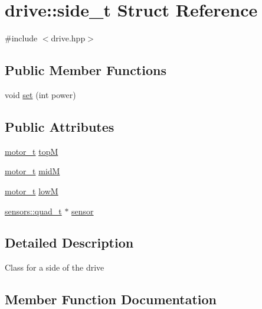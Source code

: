 \hypertarget{structdrive_1_1side__t}{}\section{drive\+:\+:side\+\_\+t Struct Reference}
\label{structdrive_1_1side__t}


{\ttfamily \#include $<$drive.\+hpp$>$}

\subsection*{Public Member Functions}
\begin{DoxyCompactItemize}
\item 
void \hyperlink{structdrive_1_1side__t_ab605b00c5f98faa239cab1b19b54e7e6}{set} (int power)
\end{DoxyCompactItemize}
\subsection*{Public Attributes}
\begin{DoxyCompactItemize}
\item 
\hyperlink{structmotor__t}{motor\+\_\+t} \hyperlink{structdrive_1_1side__t_a3a32e841a8f53200b37c040572765165}{topM}
\item 
\hyperlink{structmotor__t}{motor\+\_\+t} \hyperlink{structdrive_1_1side__t_acb33aa4a812f555b5fa0e94882d6e91a}{midM}
\item 
\hyperlink{structmotor__t}{motor\+\_\+t} \hyperlink{structdrive_1_1side__t_a38de3f1053b41c5b2824ffed7ab8c32a}{lowM}
\item 
\hyperlink{structsensors_1_1quad__t}{sensors\+::quad\+\_\+t} $\ast$ \hyperlink{structdrive_1_1side__t_a50f80a71f0be44bbb8df9b7f3f81aedf}{sensor}
\end{DoxyCompactItemize}


\subsection{Detailed Description}
Class for a side of the drive 

\subsection{Member Function Documentation}
\mbox{\label{structdrive_1_1side__t_ab605b00c5f98faa239cab1b19b54e7e6}} 
